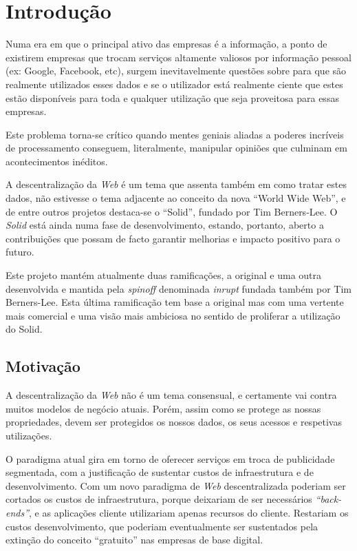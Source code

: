\chapter{Introdução}
\label{cap:1}

Numa era em que o principal ativo das empresas é a informação, a ponto de existirem empresas que trocam serviços altamente valiosos por informação pessoal (ex: Google, Facebook, etc)\cite{top_three_issues_centralized_web}, surgem inevitavelmente questões sobre para que são realmente utilizados esses dados e se o utilizador está realmente ciente que estes estão disponíveis para toda e qualquer utilização que seja proveitosa para essas empresas\cite{facebook_data_hell_medium}.

Este problema torna-se crítico quando mentes geniais aliadas a poderes incríveis de processamento conseguem, literalmente, manipular opiniões que culminam em acontecimentos inéditos\cite{cambridge_analytica}.

A descentralização da \emph{Web} é um tema que assenta também em como tratar estes dados, não estivesse o tema adjacente ao conceito da nova “World Wide Web”, e de entre outros projetos destaca-se o “Solid”, fundado por Tim Berners-Lee. O \emph{Solid} está ainda numa fase de desenvolvimento, estando, portanto, aberto a contribuições que possam de facto garantir melhorias e impacto positivo para o futuro\cite{why_web_decentralization_future}.

Este projeto mantém atualmente duas ramificações, a original e uma outra desenvolvida e mantida pela \emph{spinoff} denominada \emph{inrupt} fundada também por Tim Berners-Lee. Esta última ramificação tem base a original mas com uma vertente mais comercial e uma visão mais ambiciosa no sentido de proliferar a utilização do Solid.

\section{Motivação}
A descentralização da \emph{Web} não é um tema consensual, e certamente vai contra muitos modelos de negócio atuais. Porém, assim como se protege as nossas propriedades, devem ser protegidos os nossos dados, os seus acessos e respetivas utilizações.

O paradigma atual gira em torno de oferecer serviços em troca de publicidade segmentada, com a justificação de sustentar custos de infraestrutura e de desenvolvimento\cite{top_three_issues_centralized_web}. Com um novo paradigma de \emph{Web} descentralizada poderiam ser cortados os custos de infraestrutura, porque deixariam de ser necessários \emph{“back-ends”}, e as aplicações cliente utilizariam apenas recursos do cliente. Restariam os custos desenvolvimento, que poderiam eventualmente ser sustentados pela extinção do conceito “gratuito” nas empresas de base digital\cite{why_web_decentralization_future}.

